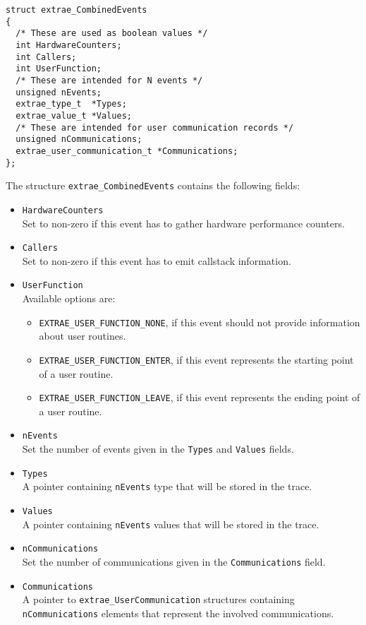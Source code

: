 \begin{verbatim}
struct extrae_CombinedEvents
{
  /* These are used as boolean values */
  int HardwareCounters;
  int Callers;
  int UserFunction;
  /* These are intended for N events */
  unsigned nEvents;
  extrae_type_t  *Types;
  extrae_value_t *Values;
  /* These are intended for user communication records */
  unsigned nCommunications;
  extrae_user_communication_t *Communications;
};
\end{verbatim}

The structure {\tt extrae\_CombinedEvents} contains the following fields:
\begin{itemize}
	\item {\tt HardwareCounters}\\
	Set to non-zero if this event has to gather hardware performance counters.
	\item {\tt Callers}\\
	Set to non-zero if this event has to emit callstack information.
	\item {\tt UserFunction}\\
	Available options are:
	\begin{itemize}
		\item {\tt EXTRAE\_USER\_FUNCTION\_NONE}, if this event should not provide information about user routines.
		\item {\tt EXTRAE\_USER\_FUNCTION\_ENTER}, if this event represents the starting point of a user routine.
		\item {\tt EXTRAE\_USER\_FUNCTION\_LEAVE}, if this event represents the ending point of a user routine.
	\end{itemize}
	\item {\tt nEvents}\\
	Set the number of events given in the {\tt Types} and {\tt Values} fields.
	\item {\tt Types}\\
	A pointer containing {\tt nEvents} type that will be stored in the trace.
	\item {\tt Values}\\
	A pointer containing {\tt nEvents} values that will be stored in the trace.
	\item {\tt nCommunications}\\
	Set the number of communications given in the {\tt Communications} field.
	\item {\tt Communications}\\
	A pointer to {\tt extrae\_UserCommunication} structures containing {\tt nCommunications} elements that represent the involved communications.
\end{itemize}

